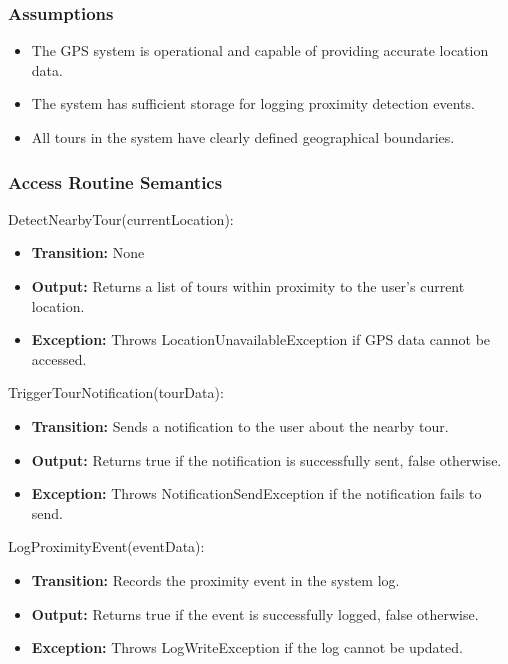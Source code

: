\documentclass[12pt, titlepage]{article}
\begin{document}
\subsubsection{Assumptions}

\begin{itemize}
  \item The GPS system is operational and capable of providing accurate location data.
  \item The system has sufficient storage for logging proximity detection events.
  \item All tours in the system have clearly defined geographical boundaries.
\end{itemize}

\subsubsection{Access Routine Semantics}

\noindent DetectNearbyTour(currentLocation):
\begin{itemize}
  \item \textbf{Transition:} None
  \item \textbf{Output:} Returns a list of tours within proximity to the user's current location.
  \item \textbf{Exception:} Throws LocationUnavailableException if GPS data cannot be accessed.
\end{itemize}

\noindent TriggerTourNotification(tourData):
\begin{itemize}
  \item \textbf{Transition:} Sends a notification to the user about the nearby tour.
  \item \textbf{Output:} Returns true if the notification is successfully sent, false otherwise.
  \item \textbf{Exception:} Throws NotificationSendException if the notification fails to send.
\end{itemize}

\noindent LogProximityEvent(eventData):
\begin{itemize}
  \item \textbf{Transition:} Records the proximity event in the system log.
  \item \textbf{Output:} Returns true if the event is successfully logged, false otherwise.
  \item \textbf{Exception:} Throws LogWriteException if the log cannot be updated.
\end{itemize}
\end{document}
